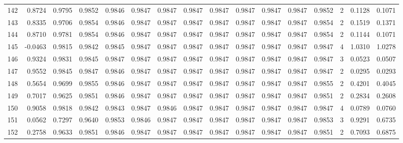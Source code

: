 \begin{tabular}{lrrrrrrrrrrrrrrr}
142 &      0.8724 &  0.9795 &  0.9852 &  0.9846 &  0.9847 &  0.9847 &  0.9847 &  0.9847 &  0.9847 &  0.9847 &   0.9847 &     0.9852 &      2 &                    0.1128 &                     0.1071 \\
143 &      0.8335 &  0.9706 &  0.9854 &  0.9846 &  0.9847 &  0.9847 &  0.9847 &  0.9847 &  0.9847 &  0.9847 &   0.9847 &     0.9854 &      2 &                    0.1519 &                     0.1371 \\
144 &      0.8710 &  0.9781 &  0.9854 &  0.9846 &  0.9847 &  0.9847 &  0.9847 &  0.9847 &  0.9847 &  0.9847 &   0.9847 &     0.9854 &      2 &                    0.1144 &                     0.1071 \\
145 &     -0.0463 &  0.9815 &  0.9842 &  0.9845 &  0.9847 &  0.9847 &  0.9847 &  0.9847 &  0.9847 &  0.9847 &   0.9847 &     0.9847 &      4 &                    1.0310 &                     1.0278 \\
146 &      0.9324 &  0.9831 &  0.9845 &  0.9847 &  0.9847 &  0.9847 &  0.9847 &  0.9847 &  0.9847 &  0.9847 &   0.9847 &     0.9847 &      3 &                    0.0523 &                     0.0507 \\
147 &      0.9552 &  0.9845 &  0.9847 &  0.9846 &  0.9847 &  0.9847 &  0.9847 &  0.9847 &  0.9847 &  0.9847 &   0.9847 &     0.9847 &      2 &                    0.0295 &                     0.0293 \\
148 &      0.5654 &  0.9699 &  0.9855 &  0.9846 &  0.9847 &  0.9847 &  0.9847 &  0.9847 &  0.9847 &  0.9847 &   0.9847 &     0.9855 &      2 &                    0.4201 &                     0.4045 \\
149 &      0.7017 &  0.9625 &  0.9851 &  0.9846 &  0.9847 &  0.9847 &  0.9847 &  0.9847 &  0.9847 &  0.9847 &   0.9847 &     0.9851 &      2 &                    0.2834 &                     0.2608 \\
150 &      0.9058 &  0.9818 &  0.9842 &  0.9843 &  0.9847 &  0.9846 &  0.9847 &  0.9847 &  0.9847 &  0.9847 &   0.9847 &     0.9847 &      4 &                    0.0789 &                     0.0760 \\
151 &      0.0562 &  0.7297 &  0.9640 &  0.9853 &  0.9846 &  0.9847 &  0.9847 &  0.9847 &  0.9847 &  0.9847 &   0.9847 &     0.9853 &      3 &                    0.9291 &                     0.6735 \\
152 &      0.2758 &  0.9633 &  0.9851 &  0.9846 &  0.9847 &  0.9847 &  0.9847 &  0.9847 &  0.9847 &  0.9847 &   0.9847 &     0.9851 &      2 &                    0.7093 &                     0.6875 \\

\end{tabular}

